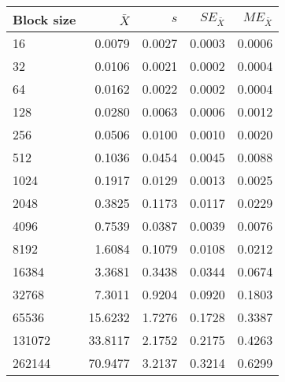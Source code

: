 \begin{tabular}{lrrrr}\toprule
{\small Block size} & $\bar{X}$ & $s$ & $SE_{\bar{X}}$ & $ME_{\bar{X}}$ \\\midrule
16 & 0.0079 & 0.0027 & 0.0003 & 0.0006\\
32 & 0.0106 & 0.0021 & 0.0002 & 0.0004\\
64 & 0.0162 & 0.0022 & 0.0002 & 0.0004\\
128 & 0.0280 & 0.0063 & 0.0006 & 0.0012\\
256 & 0.0506 & 0.0100 & 0.0010 & 0.0020\\
512 & 0.1036 & 0.0454 & 0.0045 & 0.0088\\
1024 & 0.1917 & 0.0129 & 0.0013 & 0.0025\\
2048 & 0.3825 & 0.1173 & 0.0117 & 0.0229\\
4096 & 0.7539 & 0.0387 & 0.0039 & 0.0076\\
8192 & 1.6084 & 0.1079 & 0.0108 & 0.0212\\
16384 & 3.3681 & 0.3438 & 0.0344 & 0.0674\\
32768 & 7.3011 & 0.9204 & 0.0920 & 0.1803\\
65536 & 15.6232 & 1.7276 & 0.1728 & 0.3387\\
131072 & 33.8117 & 2.1752 & 0.2175 & 0.4263\\
262144 & 70.9477 & 3.2137 & 0.3214 & 0.6299\\
\bottomrule
\end{tabular}
